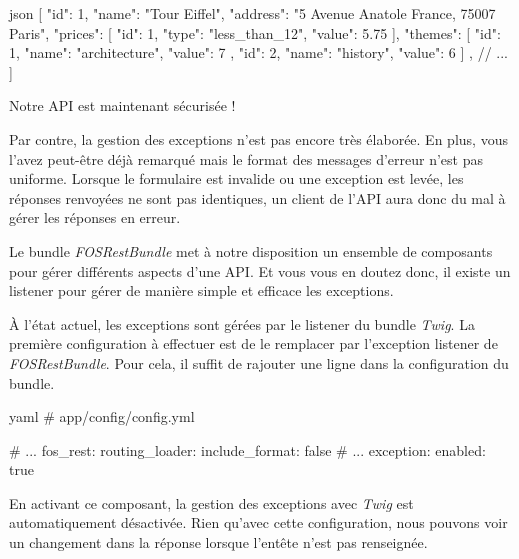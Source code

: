 \documentclass[big]{zmdocument}
\begin{document}
\begin{CodeBlock}{json}
[
  {
    "id": 1,
    "name": "Tour Eiffel",
    "address": "5 Avenue Anatole France, 75007 Paris",
    "prices": [
      {
        "id": 1,
        "type": "less_than_12",
        "value": 5.75
      }
    ],
    "themes": [
      {
        "id": 1,
        "name": "architecture",
        "value": 7
      },
      {
        "id": 2,
        "name": "history",
        "value": 6
      }
    ]
  },
  // ...
]
\end{CodeBlock}



Notre API est maintenant sécurisée !



Par contre, la gestion des exceptions n'est pas encore très élaborée. En plus, vous l'avez peut-être déjà remarqué mais le format des messages d'erreur n'est pas uniforme. Lorsque le formulaire est invalide ou une exception est levée, les réponses renvoyées ne sont pas identiques, un client de l'API aura donc du mal à gérer les réponses en erreur.





Le bundle \textit{FOSRestBundle} met à notre disposition un ensemble de composants pour gérer différents aspects d'une API. Et vous vous en doutez donc, il existe un listener pour gérer de manière simple et efficace les exceptions.



À l'état actuel, les exceptions sont gérées par le listener du bundle \textit{Twig}. La première configuration à effectuer est de le remplacer par l'exception listener de \textit{FOSRestBundle}. Pour cela, il suffit de rajouter une ligne dans la configuration du bundle.



\begin{CodeBlock}{yaml}
# app/config/config.yml

# ...
fos_rest:
    routing_loader:
        include_format: false
    # ...
    exception:
        enabled: true
\end{CodeBlock}



En activant ce composant, la gestion des exceptions avec \textit{Twig} est automatiquement désactivée.
Rien qu'avec cette configuration, nous pouvons voir un changement dans la réponse lorsque l'entête  n'est pas renseignée.
\end{document}

